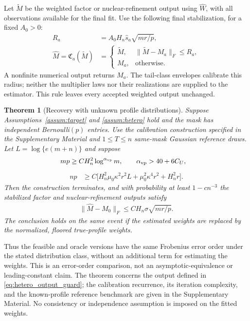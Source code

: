 \documentclass[numsec,webpdf,modern,large,namedate]{oup-authoring-template}
\theoremstyle{plain}
\newtheorem{theorem}{Theorem}[section]
\theoremstyle{remark}
\newif\ifmarkchanges
\newenvironment{revision}{\begingroup\ifmarkchanges\color{red}\fi}{\endgroup}
\begin{document}
\begin{revision}
Let $\widetilde M$ be the weighted factor or nuclear-refinement output
using $\widehat W$, with all observations available for the final fit.
Use the following final stabilization, for a fixed $A_0>0$:
\begin{align}
 R_a&=A_0H_n\widehat s_a\sqrt{mr/p},
 \label{eq:hetero_output_radius}\\
 \widehat M=\mathfrak C_a(\widetilde M)
 &=\begin{cases}
 \widetilde M,&\|\widetilde M-M_a\|_F\le R_a,\\
 M_a,&\text{otherwise}.
 \end{cases}
 \label{eq:hetero_output_guard}
\end{align}
A nonfinite numerical output returns $M_a$. The tail-class envelopes
calibrate this radius; neither the multiplier laws nor their realizations
are supplied to the estimator. This rule leaves every accepted weighted
output unchanged.

\begin{theorem}[Recovery with unknown profile distributions]
\label{thm:weighted_unknown_rate}
Suppose Assumptions~\ref{assum:target} and \ref{assum:hetero} hold and the
mask has independent Bernoulli$(p)$ entries. Use the calibration
construction specified in the Supplementary Material and $1\le T\le n$
same-mask Gaussian reference draws. Let $L=\log\{e(m+n)\}$ and suppose
\begin{align*}
 mp&\ge C H_n^2\log^{\alpha_{\rm vp}}m,
 \qquad \alpha_{\rm vp}>40+6C_U,
\end{align*}
\begin{align}
 np&\ge C\bigl[H_n^2\mu_0\kappa^2r^2L+
                   \mu_0^2\kappa^4r^2+H_n^2r\bigr].
 \label{eq:hetero_anchor_samples}
\end{align}
Then the construction terminates, and with probability at least
$1-cn^{-3}$ the stabilized factor and nuclear-refinement outputs satisfy
\begin{align}
 \|\widehat M-M_0\|_F\le C H_n\sigma\sqrt{mr/p}.
 \label{eq:hetero_certified_rate}
\end{align}
The conclusion holds on the same event if the estimated weights are
replaced by the normalized, floored true-profile weights.
\end{theorem}
Thus the feasible and oracle versions have the same Frobenius error
order under the stated distribution class, without an additional term
for estimating the weights. This is an error-order comparison, not an
asymptotic-equivalence or leading-constant claim. The theorem concerns
the output defined in \eqref{eq:hetero_output_guard}; the calibration
recurrence, its iteration complexity, and the known-profile reference
benchmark are given in the Supplementary Material. No consistency or
independence assumption is imposed on the fitted weights.
\end{revision}
\end{document}
